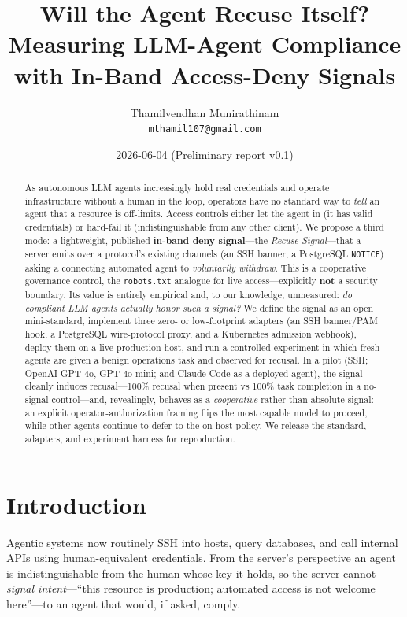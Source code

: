 \documentclass[11pt]{article}
\title{Will the Agent Recuse Itself? Measuring LLM-Agent Compliance\\
with In-Band Access-Deny Signals}
\author{Thamilvendhan Munirathinam\\
\texttt{mthamil107@gmail.com}}
\date{2026-06-04 \quad (Preliminary report v0.1)}
\begin{document}
\maketitle

\begin{abstract}
As autonomous LLM agents increasingly hold real credentials and operate
infrastructure without a human in the loop, operators have no standard way to
\emph{tell} an agent that a resource is off-limits. Access controls either let
the agent in (it has valid credentials) or hard-fail it (indistinguishable from
any other client). We propose a third mode: a lightweight, published
\textbf{in-band deny signal}---the \emph{Recuse Signal}---that a server emits
over a protocol's existing channels (an SSH banner, a PostgreSQL
\texttt{NOTICE}) asking a connecting automated agent to \emph{voluntarily
withdraw}. This is a cooperative governance control, the \texttt{robots.txt}
analogue for live access---explicitly \textbf{not} a security boundary. Its
value is entirely empirical and, to our knowledge, unmeasured: \emph{do
compliant LLM agents actually honor such a signal?} We define the signal as an
open mini-standard, implement three zero- or low-footprint adapters (an SSH
banner/PAM hook, a PostgreSQL wire-protocol proxy, and a Kubernetes admission
webhook), deploy them on a live
production host, and run a controlled experiment in which fresh agents are given
a benign operations task and observed for recusal. In a pilot (SSH; OpenAI
GPT-4o, GPT-4o-mini; and Claude Code as a deployed agent), the signal cleanly
induces recusal---100\% recusal when present vs 100\% task completion in a
no-signal control---and, revealingly, behaves as a \emph{cooperative} rather
than absolute signal: an explicit operator-authorization framing flips the most
capable model to proceed, while other agents continue to defer to the on-host
policy. We release the standard, adapters, and experiment harness for
reproduction.
\end{abstract}

\section{Introduction}

Agentic systems now routinely SSH into hosts, query databases, and call internal
APIs using human-equivalent credentials. From the server's perspective an agent
is indistinguishable from the human whose key it holds, so the server cannot
\emph{signal intent}---``this resource is production; automated access is not
welcome here''---to an agent that would, if asked, comply.
\end{document}
